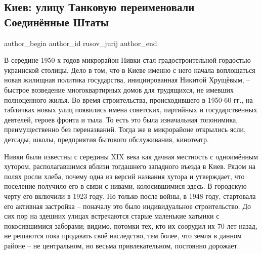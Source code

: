  
 
 
 
 
 
\subsection{Киев: улицу Танковую переименовали Соединённые Штаты}
\label{sec:23_01_2022.stz.news.ru.odnarodyna.1.kiev}
 
\ifcmt
 author_begin
   author_id rusov_jurij
 author_end
\fi

В середине 1950-х годов микрорайон Нивки стал градостроительной гордостью
украинской столицы. Дело в том, что в Киеве именно с него начала воплощаться
новая жилищная политика государства, инициированная Никитой Хрущёвым, – быстрое
возведение многоквартирных домов для трудящихся, не имевших полноценного жилья.
Во время строительства, происходившего в 1950-60 гг., на табличках новых улиц
появились имена советских, партийных и государственных деятелей, героев фронта
и тыла. То есть это была изначальная топонимика, преимущественно без
переназваний. Тогда же в микрорайоне открылись ясли, детсады, школы,
предприятия бытового обслуживания, кинотеатр.


Нивки были известны с середины XIX века как дачная местность с одноимённым
хутором, располагавшимся вблизи тогдашнего западного въезда в Киев. Рядом на
полях росли хлеба, почему одна из версий названия хутора и утверждает, что
поселение получило его в связи с нивами, колосившимися здесь. В городскую черту
его включили в 1923 году. Но только после войны, в 1948 году, стартовала его
активная застройка – поначалу это было индивидуальное строительство. До сих пор
на здешних улицах встречаются старые маленькие хатынки с покосившимися
заборами; видимо, потомки тех, кто их соорудил их 70 лет назад, не решаются
пока продавать своё наследство, тем более, что земля в данном районе – не
центральном, но весьма привлекательном, постоянно дорожает.

